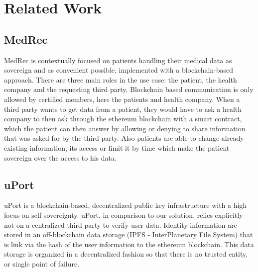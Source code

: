 \chapter{Related Work}
\label{cha:relatedwork}

\section{MedRec}

MedRec is contextually focused on patients handling their medical data as sovereign and as convenient possible,
implemented with a blockchain-based approach.
There are three main roles in the use case: the patient, the health company and the requesting third party.
Blockchain based communication is only allowed by certified members, here the patients and health company.
When a third party wants to get data from a patient, they would have to ask a health company to then ask through the
ethereum blockchain with a smart contract, which the patient can then answer by allowing or denying to share
information that was asked for by the third party.
Also patients are able to change already existing information, its access or limit it by time which make the patient
sovereign over the access to his data.



\section{uPort}
uPort is a blockchain-based, decentralized public key infrastructure with a high focus on self sovereignty. uPort, in comparison to our solution, relies explicitly not on a centralized third party to verify user data.\cite[p. 2]{uPortWhitePaper}
Identity information are stored in an off-blockchain data storage (IPFS - InterPlanetary File System) that is link via the hash of the user information to the ethereum blockchain. This data storage is organized in a decentralized fashion so that there is no trusted entity, or single point of failure. 

